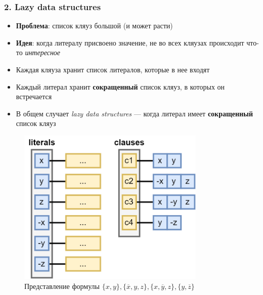 \documentclass[aspectratio=169,xcolor=table,english]{beamer}
\begin{document}
\begin{frame}[fragile] \frametitle{2. Lazy data structures}
    \begin{minipage}[m]{0.5\linewidth}
        \begin{itemize}
            \item \textbf{Проблема}: список кляуз большой (и может расти)
            \item \textbf{Идея}: когда литералу присвоено значение, не во всех кляузах происходит что-то \textit{интересное}
            \item Каждая кляуза хранит список литералов, которые в нее входят
            \item Каждый литерал хранит \textbf{сокращенный} список кляуз, в которых он встречается
            \item В общем случает \textit{lazy data structures} --- когда литерал имеет \textbf{сокращенный} список кляуз
        \end{itemize}
    \end{minipage}\hfill
    \begin{minipage}[m]{0.45\linewidth}
        \begin{figure}
            \centering
            \includegraphics[width=0.8\textwidth]{figures/lazy data structure.png}
            \caption{Представление формулы  $\{x,y\},\{\overline{x},y,z\},\{x,\overline{y},z\},\{y,\overline{z}\}$}
        \end{figure}
    \end{minipage}
\end{frame}
\end{document}
